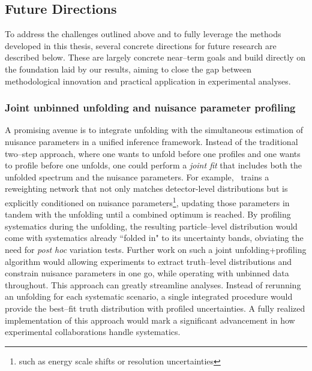         \subsection{Future Directions}
            To address the challenges outlined above and to fully leverage the methods developed in this thesis, several concrete directions for future research are described below.
            These are largely concrete near--term goals and build directly on the foundation laid by our results, aiming to close the gap between methodological innovation and practical application in experimental analyses.

            \subsubsection{Joint unbinned unfolding and nuisance parameter profiling}
                A promising avenue is to integrate unfolding with the simultaneous estimation of nuisance parameters in a unified inference framework.
                Instead of the traditional two--step approach, where one wants to unfold before one profiles and one wants to profile before one unfolds, one could perform a \emph{joint fit} that includes both the unfolded spectrum and the nuisance parameters.
                For example,~\cite{zhu2024multidimensional} trains a reweighting network that not only matches detector-level distributions but is explicitly conditioned on nuisance parameters\footnote{such as energy scale shifts or resolution uncertainties}, updating those parameters in tandem with the unfolding until a combined optimum is reached.
                By profiling systematics during the unfolding, the resulting particle--level distribution would come with systematics already ``folded in" to its uncertainty bands, obviating the need for \textit{post hoc} variation tests.
                Further work on such a joint unfolding+profiling algorithm would allowing experiments to extract truth--level distributions and constrain nuisance parameters in one go, while operating with unbinned data throughout.
                This approach can greatly streamline analyses.
                Instead of rerunning an unfolding for each systematic scenario, a single integrated procedure would provide the best--fit truth distribution with profiled uncertainties.
                A fully realized implementation of this approach would mark a significant advancement in how experimental collaborations handle systematics.

